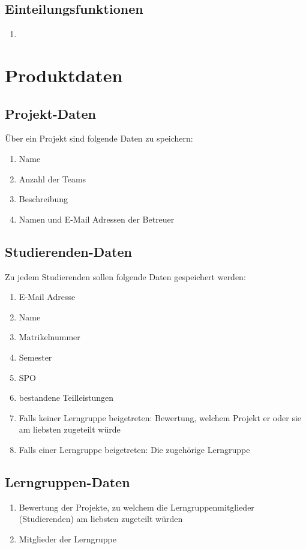 \documentclass[parskip=full]{scrartcl}
\newcommand{\swtLabel}[1]{\textbf{\textbackslash #1\arabic*0\textbackslash}}
\begin{document}
\subsection{Einteilungsfunktionen}
\begin{enumerate}[label=\swtLabel{FA}, resume]
  \item 
\end{enumerate}

\section{Produktdaten}

\subsection{Projekt-Daten} 
Über ein Projekt sind folgende Daten zu speichern:
\begin{enumerate}[label=\swtLabel{D}] 
  \item Name
  \item Anzahl der Teams
  \item Beschreibung
  \item Namen und E-Mail Adressen der Betreuer
\end{enumerate}
\subsection{Studierenden-Daten} 
Zu jedem Studierenden sollen folgende Daten gespeichert werden:
\begin{enumerate}[label=\swtLabel{D}, resume] 
  \item E-Mail Adresse \label{SDatenAnfang}
  \item Name
  \item Matrikelnummer
  \item Semester
  \item SPO
  \item bestandene Teilleistungen \label{SDatenEnde}
  \item Falls keiner Lerngruppe beigetreten: Bewertung, welchem Projekt er oder
  sie am liebsten zugeteilt würde
  \item Falls einer Lerngruppe beigetreten: Die zugehörige Lerngruppe
\end{enumerate}
\subsection{Lerngruppen-Daten} 
\begin{enumerate}[label=\swtLabel{D}, resume] 
  \item Bewertung der Projekte, zu welchem die Lerngruppenmitglieder
  (Studierenden) am liebsten zugeteilt würden
  \item Mitglieder der Lerngruppe
\end{enumerate}
\end{document}
